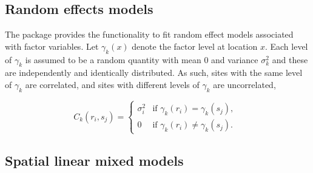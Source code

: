 \documentclass[nojss]{jss}
\begin{document}
\subsection{Random effects models}

The  package provides the functionality to fit random effect
models associated with factor variables. Let $\gamma_k(x)$ denote the
factor level at location $x$. Each level of $\gamma_k$ is assumed to
be a random quantity with mean 0 and variance $\sigma^2_k$ and these
are independently and identically distributed. As such, sites with the
same level of $\gamma_k$ are correlated, and sites with different
levels of $\gamma_k$ are uncorrelated,

\begin{equation}
  C_{k}(r_i,s_j)= \left\{ \begin{array}{ll}
      \sigma_i^2 &
      \textrm{if $\gamma_k(r_i) = \gamma_k(s_j)$}, \\
      0 &
      \textrm{if $\gamma_k(r_i) \neq \gamma_k(s_j).$ }
    \end{array} \right.
\end{equation}


\subsection{Spatial linear mixed models} \label{sec:SpatialLinearMixedModels}
\end{document}
